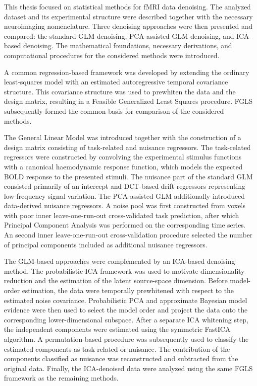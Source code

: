 \documentclass[english]{pwr_wmat_praca_dyplomowa}
\theoremstyle{definition}
\theoremstyle{remark}
\begin{document}
This thesis focused on statistical methods for fMRI data denoising. The analyzed dataset and its experimental structure were described together with the necessary neuroimaging nomenclature. Three denoising approaches were then presented and compared: the standard GLM denoising, PCA-assisted GLM denoising, and ICA-based denoising. The mathematical foundations, necessary derivations, and computational procedures for the considered methods were introduced.

A common regression-based framework was developed by extending the ordinary least-squares model with an estimated autoregressive temporal covariance structure. This covariance structure was used to prewhiten the data and the design matrix, resulting in a Feasible Generalized Least Squares procedure. FGLS subsequently formed the common basis for comparison of the considered methods.

The General Linear Model was introduced together with the construction of a design matrix consisting of task-related and nuisance regressors. The task-related regressors were constructed by convolving the experimental stimulus functions with a canonical haemodynamic response function, which models the expected BOLD response to the presented stimuli. The nuisance part of the standard GLM consisted primarily of an intercept and DCT-based drift regressors representing low-frequency signal variation. The PCA-assisted GLM additionally introduced data-derived nuisance regressors. A noise pool was first constructed from voxels with poor inner leave-one-run-out cross-validated task prediction, after which Principal Component Analysis was performed on the corresponding time series. An second inner leave-one-run-out cross-validation procedure selected the number of principal components included as additional nuisance regressors.

The GLM-based approaches were complemented by an ICA-based denoising method. The probabilistic ICA framework was used to motivate dimensionality reduction and the estimation of the latent source-space dimension. Before model-order estimation, the data were temporally prewhitened with respect to the estimated noise covariance. Probabilistic PCA and approximate Bayesian model evidence were then used to select the model order and project the data onto the corresponding lower-dimensional subspace. After a separate ICA whitening step, the independent components were estimated using the symmetric FastICA algorithm. A permutation-based procedure was subsequently used to classify the estimated components as task-related or nuisance. The contribution of the components classified as nuisance was reconstructed and subtracted from the original data. Finally, the ICA-denoised data were analyzed using the same FGLS framework as the remaining methods.
\end{document}
